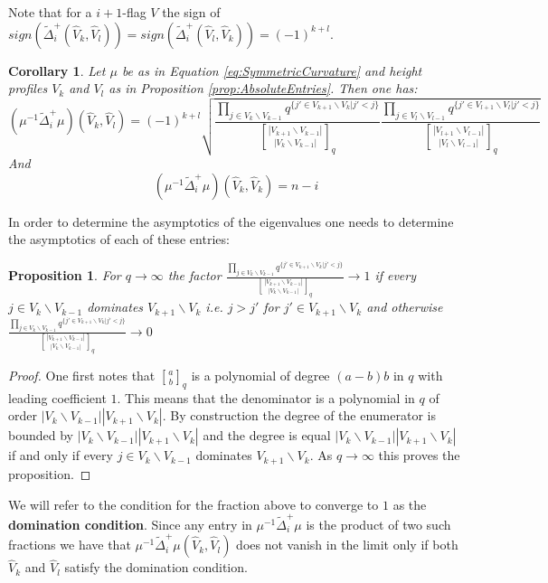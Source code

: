 \documentclass[11pt]{amsart}
\newtheorem{corollary}[theorem]{Corollary}
\newtheorem{proposition}[theorem]{Proposition}
\newcommand{\gBinom}{\genfrac{[}{]}{0pt}{}}
\begin{document}
    Note that for a $i+1$-flag $V$ the  sign of $sign(\tilde{\Delta}_i^+(\hat{V}_k,\hat{V}_l))=sign(\tilde{\Delta}_i^+(\hat{V}_l,\hat{V}_k))=(-1)^{k+l}$.
    \begin{corollary}
        Let $\mu$ be as in Equation \ref{eq:SymmetricCurvature} and height profiles $V_k$ and $V_l$ as in Proposition \ref{prop:AbsoluteEntries}. Then one has:
        \begin{equation}
            \left(\mu^{-1}\tilde{\Delta}_i^+\mu\right)(\hat{V}_k,\hat{V}_l)=(-1)^{k+l}\sqrt{\frac{\prod_{j\in V_k\backslash V_{k-1}}q^{\{j'\in V_{k+1}\backslash V_k|j'<j\}}}{\gBinom{|V_{k+1}\backslash V_{k-1}|}{|V_{k}\backslash V_{k-1}|}_q} \frac{\prod_{j\in V_l\backslash V_{l-1}}q^{\{j'\in V_{l+1}\backslash V_l|j'<j\}}}{\gBinom{|V_{l+1}\backslash V_{l-1}|}{|V_{l}\backslash V_{l-1}|}_q}}
        \end{equation}
        And
        \begin{equation}
            \left(\mu^{-1}\tilde{\Delta}_i^+\mu\right)(\hat{V}_k,\hat{V}_k)=n-i
        \end{equation}
    \end{corollary}
    In order to determine the asymptotics of the eigenvalues one needs to determine the asymptotics of each of these entries:
    \begin{proposition}
        For $q\rightarrow\infty$ the factor $\frac{\prod_{j\in V_k\backslash V_{k-1}}q^{\{j'\in V_{k+1}\backslash V_k|j'<j\}}}{\gBinom{|V_{k+1}\backslash V_{k-1}|}{|V_{k}\backslash V_{k-1}|}_q}\rightarrow 1$ if every $j\in V_k\backslash V_{k-1}$ dominates $V_{k+1}\backslash V_k$ i.e. $j>j'$ for $j'\in V_{k+1}\backslash V_k$ and otherwise $\frac{\prod_{j\in V_k\backslash V_{k-1}}q^{\{j'\in V_{k+1}\backslash V_k|j'<j\}}}{\gBinom{|V_{k+1}\backslash V_{k-1}|}{|V_{k}\backslash V_{k-1}|}_q}\rightarrow 0$
        \label{prop:DegenerateEntries}
    \end{proposition}
    \begin{proof}
        One first notes that $\gBinom{a}{b}_q$ is a polynomial of degree $(a-b)b$ in $q$ with leading coefficient $1$. This means that the denominator is a polynomial in $q$ of order $|V_k\backslash V_{k-1}||V_{k+1}\backslash V_k|$. By construction the degree of the enumerator is bounded by $|V_k\backslash V_{k-1}||V_{k+1}\backslash V_k|$ and the degree is equal $|V_k\backslash V_{k-1}||V_{k+1}\backslash V_k|$ if and only if every $j\in V_k\backslash V_{k-1}$ dominates $V_{k+1}\backslash V_k$. As $q\rightarrow\infty$ this proves the proposition.
    \end{proof}
    We will refer to the condition for the fraction above to converge to $1$ as the \textbf{domination condition}. Since any entry in $\mu^{-1}\tilde{\Delta}_i^+\mu$ is the product of two such fractions we have that $\mu^{-1}\tilde{\Delta}_i^+\mu(\hat{V}_k, \hat{V}_l)$ does not vanish in the limit only if both $\hat{V}_k$ and $\hat{V}_l$ satisfy the domination condition. 
\end{document}
